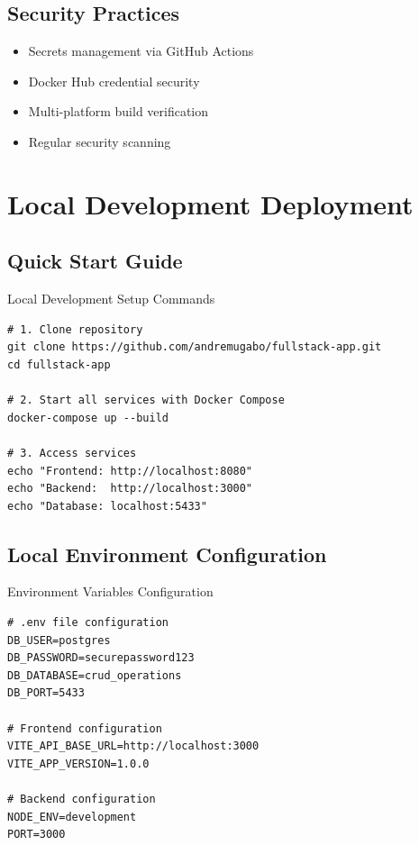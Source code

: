 \documentclass[12pt]{article}
\begin{document}
\subsection{Security Practices}
\begin{itemize}
  \item \textcolor{green}{\faLock} Secrets management via GitHub Actions
  \item \textcolor{green}{\faLock} Docker Hub credential security
  \item \textcolor{green}{\faLock} Multi-platform build verification
  \item \textcolor{green}{\faLock} Regular security scanning
\end{itemize}


\section{Local Development Deployment}

\subsection{Quick Start Guide}
\begin{codebox}{Local Development Setup Commands}
\begin{lstlisting}
# 1. Clone repository
git clone https://github.com/andremugabo/fullstack-app.git
cd fullstack-app

# 2. Start all services with Docker Compose
docker-compose up --build

# 3. Access services
echo "Frontend: http://localhost:8080"
echo "Backend:  http://localhost:3000"
echo "Database: localhost:5433"
\end{lstlisting}
\end{codebox}

\subsection{Local Environment Configuration}
\begin{codebox}{Environment Variables Configuration}
\begin{lstlisting}
# .env file configuration
DB_USER=postgres
DB_PASSWORD=securepassword123
DB_DATABASE=crud_operations
DB_PORT=5433

# Frontend configuration
VITE_API_BASE_URL=http://localhost:3000
VITE_APP_VERSION=1.0.0

# Backend configuration
NODE_ENV=development
PORT=3000
\end{lstlisting}
\end{codebox}
\end{document}
